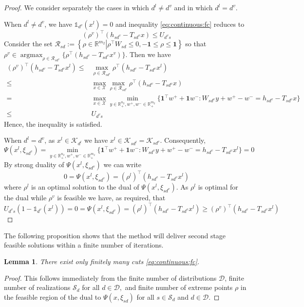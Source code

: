 \documentclass[12pt]{article}
\newtheorem{lemma}[theorem]{Lemma}%
\theoremstyle{thmstylethree}%
\newcommand{\mtc}[1] {\mathcal{#1}}
\def\R{\ensuremath{\mathbb{R}}}
\def\Ind{\ensuremath{\mathbb{1}}}
\DeclareMathOperator*{\argmax}{argmax}
\begin{document}
\begin{proof}
We consider separately the cases in which $d^l\neq d^v$ and in which $d^l=d^v$.

When $d^l\neq d^v$, we have $\Ind_{d^v}(x^l)=0$ and inequality \eqref{eq:continuous:fc} reduces to 
$$(\rho^v)^\top(h_{sd^v}-T_{sd^v}x)\leq U_{d^vs}$$
Consider the set $\mtc{R}_{sd}:=\left\{\rho\in\R^{m_2}\left\vert \rho^\top W_{sd}\leq 0,-\mathbf{1}\leq\rho\leq \mathbf{1}\right.\right\}$
so that $\rho^v\in \argmax_{\rho\in\mtc{R}_{sd^v}} \{\rho^\top(h_{sd^v}-T_{sd^v}x^v)\}$. 
Then we have
\begin{align*}
  (\rho^v)^\top(h_{sd^v}-T_{sd^v}x^l)\leq& \max_{\rho\in\mtc{R}_{sd^v}}\rho^\top(h_{sd^v}-T_{sd^v}x^l)\\
  \leq &\max_{x\in\mtc{X}}\max_{\rho\in\mtc{R}_{sd^v}}\rho^\top(h_{sd^v}-T_{sd^v}x)\\
  =&\max_{x\in\mtc{X}}\min_{y\in\R^{n_2}_+,w^+,w^-\in\R^{m_2}_+}\{\mathbf{1}^\top w^++\mathbf{1}w^-:W_{sd^v}y+w^+-w^-=h_{sd^v}-T_{sd^v}x\}\\
  \leq & U_{d^vs}
\end{align*}
Hence, the inequality is satisfied.

When $d^l=d^v$, as $x^l\in\mtc{K}_{d^l}$ we have $x^l\in\mtc{K}_{sd^l}=\mtc{K}_{sd^v}$.
Consequently, 
$$\Psi(x^l,\xi_{sd^v})=\min_{y\in\R^{n_2}_+,w^+,w^-\in\R^{m_2}_+}\{\mathbf{1}^\top w^++\mathbf{1}w^-:W_{sd^v}y+w^+-w^-=h_{sd^v}-T_{sd^v}x^l\}=0$$
By strong duality of $\Psi(x^l,\xi_{sd^v})$ we can write
$$0=\Psi(x^l,\xi_{sd^v})=(\rho^l)^\top(h_{sd^v}-T_{sd^v}x^l)$$
where $\rho^l$ is an optimal solution to the dual of $\Psi(x^l,\xi_{sd^v})$.
As $\rho^l$ is optimal for the dual while $\rho^v$ is feasible we have, as required, that
$$U_{d^vs}(1-\Ind_{d^v}(x^l))=0=\Psi(x^l,\xi_{sd^v})=(\rho^l)^\top(h_{sd^v}-T_{sd^v}x^l)\geq (\rho^v)^\top(h_{sd^v}-T_{sd^v}x^l)$$

\end{proof}

The following proposition shows that the method will deliver second stage feasible solutions within a finite number of iterations. 
\begin{lemma}\label{prop:fc:continuous:finite}
 There exist only finitely many cuts \eqref{eq:continuous:fc}.
\end{lemma}
\begin{proof}
This follows immediately from the finite number of distributions $\mtc{D}$, finite number of realizations $\mtc{S}_d$ for all $d\in\mtc{D},$ and finite number of extreme points $\rho$ in the feasible region of the dual to $\Psi(x,\xi_{sd})$ for all $s\in\mtc{S}_d$ and $d\in\mtc{D}$.
\end{proof}
\end{document}
